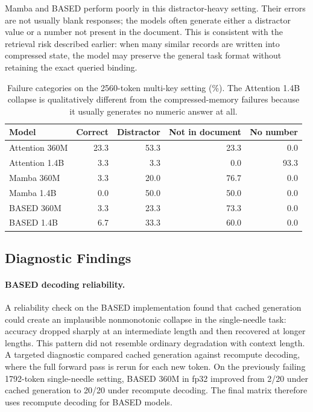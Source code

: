 \documentclass[10pt]{article}
\begin{document}
Mamba and BASED perform poorly in this distractor-heavy setting. Their errors
are not usually blank responses; the models often generate either a distractor
value or a number not present in the document. This is consistent with the
retrieval risk described earlier: when many similar records are written into
compressed state, the model may preserve the general task format without
retaining the exact queried binding.

\begin{table}[H]
\centering
\small
\setlength{\tabcolsep}{5pt}
\renewcommand{\arraystretch}{1.1}
\begin{tabular}{lrrrr}
\toprule
\textbf{Model} & \textbf{Correct} & \textbf{Distractor} &
\textbf{Not in document} & \textbf{No number} \\
\midrule
Attention 360M & 23.3 & 53.3 & 23.3 & 0.0 \\
Attention 1.4B & 3.3 & 3.3 & 0.0 & 93.3 \\
Mamba 360M & 3.3 & 20.0 & 76.7 & 0.0 \\
Mamba 1.4B & 0.0 & 50.0 & 50.0 & 0.0 \\
BASED 360M & 3.3 & 23.3 & 73.3 & 0.0 \\
BASED 1.4B & 6.7 & 33.3 & 60.0 & 0.0 \\
\bottomrule
\end{tabular}
\caption{Failure categories on the 2560-token multi-key setting (\%). The
Attention 1.4B collapse is qualitatively different from the compressed-memory
failures because it usually generates no numeric answer at all.}
\label{tab:failure-2560}
\end{table}

\subsection{Diagnostic Findings}
\label{sec:diagnostics}

\paragraph{BASED decoding reliability.}

A reliability check on the BASED implementation found that cached generation
could create an implausible nonmonotonic collapse in the single-needle task:
accuracy dropped sharply at an intermediate length and then recovered at longer
lengths. This pattern did not resemble ordinary degradation with context
length. A targeted diagnostic compared cached generation against recompute
decoding, where the full forward pass is rerun for each new token. On the
previously failing 1792-token single-needle setting, BASED 360M in fp32
improved from 2/20 under cached generation to 20/20 under recompute decoding.
The final matrix therefore uses recompute decoding for BASED models.
\end{document}
